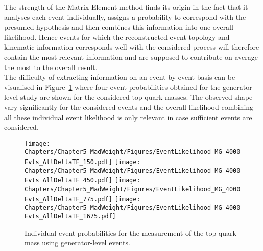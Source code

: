 The strength of the Matrix Element method finds its origin in the fact that it analyses each event individually, assigns a probability to correspond with the presumed hypothesis and then combines this information into one overall likelihood.
Hence events for which the reconstructed event topology and kinematic information corresponds well with the considered process will therefore contain the most relevant information and are supposed to contribute on average the most to the overall result.
\\
The difficulty of extracting information on an event-by-event basis can be visualised in Figure~\ref{fig::EvtProbsMTGen} where four event probabilities obtained for the generator-level study are shown for the considered top-quark masses.
The observed shape vary significantly for the considered events and the overall likelihood combining all these individual event likelihood is only relevant in case sufficient events are considered.
\\
\begin{figure}[h!tb]
 \centering
 \texttt{[image: Chapters/Chapter5\_MadWeight/Figures/EventLikelihood\_MG\_4000Evts\_AllDeltaTF\_150.pdf]} \vspace{0.2cm}
 \texttt{[image: Chapters/Chapter5\_MadWeight/Figures/EventLikelihood\_MG\_4000Evts\_AllDeltaTF\_450.pdf]} \vspace{0.2cm}
 \texttt{[image: Chapters/Chapter5\_MadWeight/Figures/EventLikelihood\_MG\_4000Evts\_AllDeltaTF\_775.pdf]} \vspace{0.2cm}
 \texttt{[image: Chapters/Chapter5\_MadWeight/Figures/EventLikelihood\_MG\_4000Evts\_AllDeltaTF\_1675.pdf]} \vspace{0.2cm}
 \caption{Individual event probabilities for the measurement of the top-quark mass using generator-level events.} \label{fig::EvtProbsMTGen}
\end{figure}

